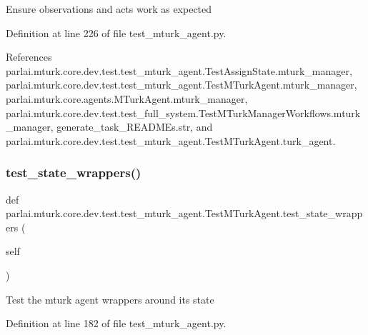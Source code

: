 \begin{DoxyVerb}Ensure observations and acts work as expected\end{DoxyVerb}
 

Definition at line 226 of file test\+\_\+mturk\+\_\+agent.\+py.



References parlai.\+mturk.\+core.\+dev.\+test.\+test\+\_\+mturk\+\_\+agent.\+Test\+Assign\+State.\+mturk\+\_\+manager, parlai.\+mturk.\+core.\+dev.\+test.\+test\+\_\+mturk\+\_\+agent.\+Test\+M\+Turk\+Agent.\+mturk\+\_\+manager, parlai.\+mturk.\+core.\+agents.\+M\+Turk\+Agent.\+mturk\+\_\+manager, parlai.\+mturk.\+core.\+dev.\+test.\+test\+\_\+full\+\_\+system.\+Test\+M\+Turk\+Manager\+Workflows.\+mturk\+\_\+manager, generate\+\_\+task\+\_\+\+R\+E\+A\+D\+M\+Es.\+str, and parlai.\+mturk.\+core.\+dev.\+test.\+test\+\_\+mturk\+\_\+agent.\+Test\+M\+Turk\+Agent.\+turk\+\_\+agent.

\mbox{\label{classparlai_1_1mturk_1_1core_1_1dev_1_1test_1_1test__mturk__agent_1_1TestMTurkAgent_af3269a504f0c00fc9de307153e55adbd}} 
\subsubsection{\texorpdfstring{test\+\_\+state\+\_\+wrappers()}{test\_state\_wrappers()}}
{\footnotesize\ttfamily def parlai.\+mturk.\+core.\+dev.\+test.\+test\+\_\+mturk\+\_\+agent.\+Test\+M\+Turk\+Agent.\+test\+\_\+state\+\_\+wrappers (\begin{DoxyParamCaption}\item[{}]{self }\end{DoxyParamCaption})}

\begin{DoxyVerb}Test the mturk agent wrappers around its state\end{DoxyVerb}
 

Definition at line 182 of file test\+\_\+mturk\+\_\+agent.\+py.



